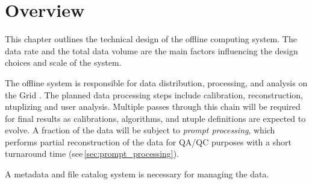 \section{Overview}




This chapter outlines  the technical design of the offline computing system.
The data rate and the total data volume are the main factors influencing the design choices and scale of the system.   

 The offline system is responsible for data distribution, processing, and analysis on the Grid \cite{data_managm_sys}.  
The planned data processing steps include  
calibration, reconstruction, ntuplizing and user analysis.  Multiple passes through this chain will be required for final results as
calibrations, algorithms, and ntuple definitions are expected to evolve.
A fraction of the data will be subject to \textit{prompt processing}, which performs partial reconstruction of the data for QA/QC purposes
with a short turnaround time (see\,\ref{sec:prompt_processing}).

 A metadata and file catalog system is necessary for managing the data.

